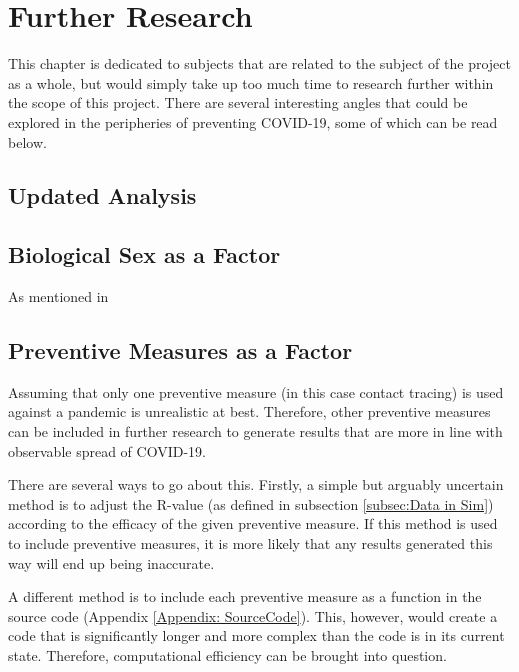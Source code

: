 \chapter{Further Research} \label{chap:Further research}

This chapter is dedicated to subjects that are related to the subject of the project as a whole, but would simply take up too much time to research further within the scope of this project. There are several interesting angles that could be explored in the peripheries of preventing COVID-19, some of which can be read below.

\section{Updated Analysis}



\section{Biological Sex as a Factor}

As mentioned in 


\section{Preventive Measures as a Factor}

Assuming that only one preventive measure (in this case contact tracing) is used against a pandemic is unrealistic at best. Therefore, other preventive measures can be included in further research to generate results that are more in line with observable spread of COVID-19. 

There are several ways to go about this. Firstly, a simple but arguably uncertain method is to adjust the R-value (as defined in subsection \vref{subsec:Data in Sim}) according to the efficacy of the given preventive measure. If this method is used to include preventive measures, it is more likely that any results generated this way will end up being inaccurate.

A different method is to include each preventive measure as a function in the source code (Appendix \ref{Appendix: SourceCode}). This, however, would create a code that is significantly longer and more complex than the code is in its current state. Therefore, computational efficiency can be brought into question. 